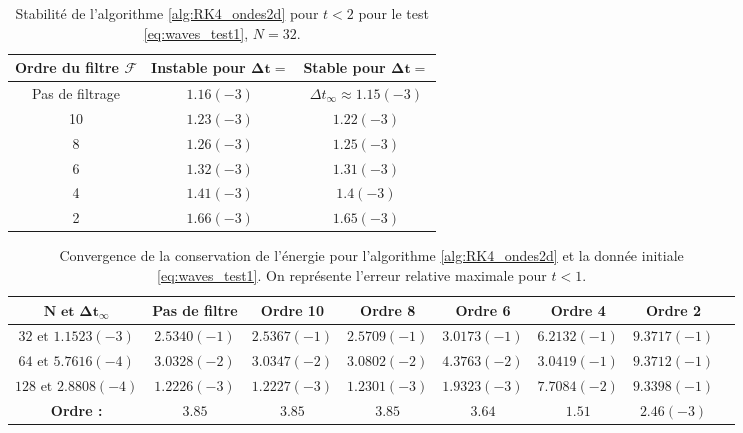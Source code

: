 \begin{table}[htbp]
\begin{center}
\begin{tabular}{|c||c|c|}
\hline
\textbf{Ordre du filtre} $\mathbf{\mathcal{F}}$  & \textbf{Instable pour} $\mathbf{\Delta t =}$ & \textbf{Stable pour} $\mathbf{\Delta t =}$ \\
\hline
\hline
Pas de filtrage & $1.16(-3)$ & $\Delta t_{\infty} \approx 1.15(-3)$\\
10 & $1.23(-3)$ & $1.22(-3)$ \\
8 & $1.26(-3)$ & $1.25(-3)$ \\
6 & $1.32(-3)$ & $1.31(-3)$ \\
4 & $1.41(-3)$ & $1.4(-3)$ \\
2 & $1.66(-3)$ & $1.65(-3)$ \\
\hline
\end{tabular}
\end{center}
\caption{Stabilité de l'algorithme \ref{alg:RK4_ondes2d} pour $t<2$ pour le test \eqref{eq:waves_test1}, $N=32$.}
\label{tab:dt_critique_waves}
\end{table} 


\begin{table}[htbp]
\begin{center}
\begin{tabular}{|c||c|c|c|c|c|c|c|}
\hline
$\mathbf{N \text{ et } \Delta t _{\infty}}$ & \textbf{Pas de filtre} & \textbf{Ordre 10} & \textbf{Ordre 8} & \textbf{Ordre 6} & \textbf{Ordre 4} & \textbf{Ordre 2}\\
\hline
$32\text{ et }1.1523(-3)$ & $2.5340(-1)$ & $2.5367(-1)$ & $2.5709(-1)$ & $3.0173(-1)$ & $6.2132(-1)$ & $9.3717(-1)$ \\
\hline
$64\text{ et }5.7616(-4)$ & $3.0328(-2)$ & $3.0347(-2)$ & $3.0802(-2)$ & $4.3763(-2)$ & $3.0419(-1)$ & $9.3712(-1)$ \\
\hline
$128\text{ et }2.8808(-4)$& $1.2226(-3)$ & $1.2227(-3)$ & $1.2301(-3)$ & $1.9323(-3)$ & $7.7084(-2)$ & $9.3398(-1)$ \\
\hline
\hline
\textbf{Ordre :} & $3.85$ & $3.85$ & $3.85$ & $3.64$ & $1.51$ & $2.46(-3)$ \\
\hline 
\end{tabular}
\end{center}
\caption{Convergence de la conservation de l'énergie pour l'algorithme \ref{alg:RK4_ondes2d} et la donnée initiale \eqref{eq:waves_test1}. On représente l'erreur relative maximale pour $t<1$.}
\label{tab:conservation_waves}
\end{table} 




























